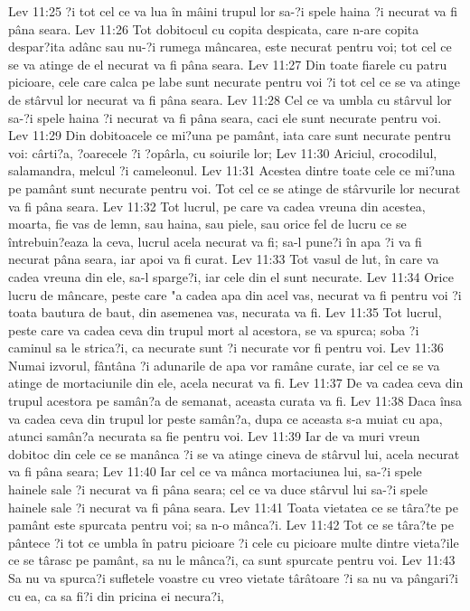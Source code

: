 Lev 11:25  ?i tot cel ce va lua în mâini trupul lor sa-?i spele haina ?i necurat va fi pâna seara.
Lev 11:26  Tot dobitocul cu copita despicata, care n-are copita despar?ita adânc sau nu-?i rumega mâncarea, este necurat pentru voi; tot cel ce se va atinge de el necurat va fi pâna seara.
Lev 11:27  Din toate fiarele cu patru picioare, cele care calca pe labe sunt necurate pentru voi ?i tot cel ce se va atinge de stârvul lor necurat va fi pâna seara.
Lev 11:28  Cel ce va umbla cu stârvul lor sa-?i spele haina ?i necurat va fi pâna seara, caci ele sunt necurate pentru voi.
Lev 11:29  Din dobitoacele ce mi?una pe pamânt, iata care sunt necurate pentru voi: cârti?a, ?oarecele ?i ?opârla, cu soiurile lor;
Lev 11:30  Ariciul, crocodilul, salamandra, melcul ?i cameleonul.
Lev 11:31  Acestea dintre toate cele ce mi?una pe pamânt sunt necurate pentru voi. Tot cel ce se atinge de stârvurile lor necurat va fi pâna seara.
Lev 11:32  Tot lucrul, pe care va cadea vreuna din acestea, moarta, fie vas de lemn, sau haina, sau piele, sau orice fel de lucru ce se întrebuin?eaza la ceva, lucrul acela necurat va fi; sa-l pune?i în apa ?i va fi necurat pâna seara, iar apoi va fi curat.
Lev 11:33  Tot vasul de lut, în care va cadea vreuna din ele, sa-l sparge?i, iar cele din el sunt necurate.
Lev 11:34  Orice lucru de mâncare, peste care "a cadea apa din acel vas, necurat va fi pentru voi ?i toata bautura de baut, din asemenea vas, necurata va fi.
Lev 11:35  Tot lucrul, peste care va cadea ceva din trupul mort al acestora, se va spurca; soba ?i caminul sa le strica?i, ca necurate sunt ?i necurate vor fi pentru voi.
Lev 11:36  Numai izvorul, fântâna ?i adunarile de apa vor ramâne curate, iar cel ce se va atinge de mortaciunile din ele, acela necurat va fi.
Lev 11:37  De va cadea ceva din trupul acestora pe samân?a de semanat, aceasta curata va fi.
Lev 11:38  Daca însa va cadea ceva din trupul lor peste samân?a, dupa ce aceasta s-a muiat cu apa, atunci samân?a necurata sa fie pentru voi.
Lev 11:39  Iar de va muri vreun dobitoc din cele ce se manânca ?i se va atinge cineva de stârvul lui, acela necurat va fi pâna seara;
Lev 11:40  Iar cel ce va mânca mortaciunea lui, sa-?i spele hainele sale ?i necurat va fi pâna seara; cel ce va duce stârvul lui sa-?i spele hainele sale ?i necurat va fi pâna seara.
Lev 11:41  Toata vietatea ce se târa?te pe pamânt este spurcata pentru voi; sa n-o mânca?i.
Lev 11:42  Tot ce se târa?te pe pântece ?i tot ce umbla în patru picioare ?i cele cu picioare multe dintre vieta?ile ce se târasc pe pamânt, sa nu le mânca?i, ca sunt spurcate pentru voi.
Lev 11:43  Sa nu va spurca?i sufletele voastre cu vreo vietate târâtoare ?i sa nu va pângari?i cu ea, ca sa fi?i din pricina ei necura?i,
